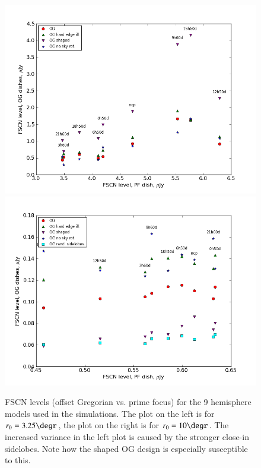 \documentclass{aa}
\begin{document}
\begin{figure}
  \includegraphics[width=\columnwidth]{cc-fields-325}
  \includegraphics[width=\columnwidth]{cc-fields-10}
\caption{\label{fig:fscn-fields}FSCN levels (offset Gregorian vs. prime focus) for the 9 hemisphere models used in the simulations. The plot on the left is for $r_0=3.25\degr$, the plot on the right is for $r_0=10\degr$. The increased variance in the left plot is caused by the stronger close-in sidelobes. Note how the shaped OG design is especially susceptible to this.}
\end{figure}
\end{document}
